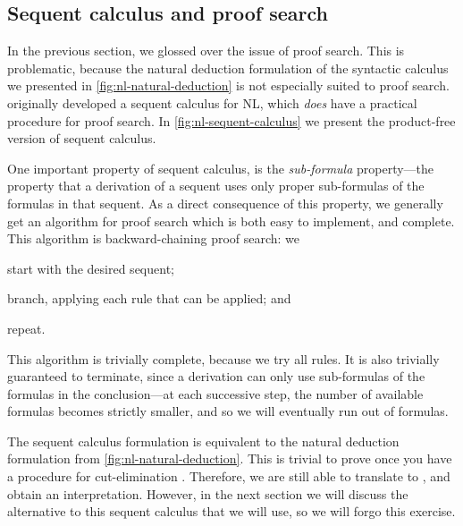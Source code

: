 \subsection{Sequent calculus and proof search}
\label{sec:sequent-calculus-and-proof-search}

In the previous section, we glossed over the issue of proof
search. This is problematic, because the natural deduction formulation
of the syntactic calculus we presented in
\autoref{fig:nl-natural-deduction} is not especially suited to proof
search. \citeauthor{lambek1961} originally developed a sequent
calculus for NL, which \emph{does} have a practical procedure for
proof search. In \autoref{fig:nl-sequent-calculus} we present the
product-free version of  sequent calculus.



One important property of sequent calculus, is the \emph{sub-formula}
property---the property that a derivation of a sequent uses only
proper sub-formulas of the formulas in that sequent.
As a direct consequence of this property, we generally get an
algorithm for proof search which is both easy to implement, and
complete. This algorithm is backward-chaining proof search: we
\begin{enumerate*}[label=(\arabic*)]
\item start with the desired sequent;
\item branch, applying each rule that can be applied; and
\item repeat.
\end{enumerate*}
This algorithm is trivially complete, because we try all rules. It is
also trivially guaranteed to terminate, since a derivation can only
use sub-formulas of the formulas in the conclusion---at each
successive step, the number of available formulas becomes strictly
smaller, and so we will eventually run out of formulas.

The sequent calculus formulation is equivalent to the natural
deduction formulation from \autoref{fig:nl-natural-deduction}.
This is trivial to prove once you have a procedure for cut-elimination
\citep[see][p.\ 107]{moot2012}. Therefore, we are still able to
translate to \lamET, and obtain an interpretation. However, in the
next section we will discuss the alternative to this sequent calculus
that we will use, so we will forgo this exercise.

